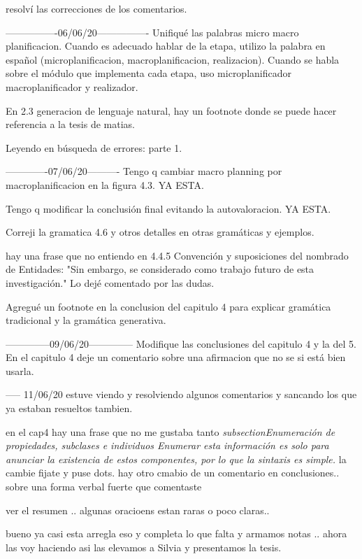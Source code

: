 resolví las correcciones de los comentarios.

----------------06/06/20----------------
Unifiqué las palabras micro macro planificacion. Cuando es adecuado hablar de la etapa, utilizo la palabra en español (microplanificacion, macroplanificacion, realizacion). Cuando se habla sobre el módulo que implementa cada etapa, uso microplanificador macroplanificador y realizador.

En 2.3 generacion de lenguaje natural, hay un footnote donde se puede hacer referencia a la tesis de matias.

Leyendo en búsqueda de errores: parte 1.


-------------07/06/20----------
Tengo q cambiar macro planning por macroplanificacion en la figura 4.3. YA ESTA.

Tengo q modificar la conclusión final evitando la autovaloracion. YA ESTA.

Correji la gramatica 4.6 y otros detalles en otras gramáticas y ejemplos.

hay una frase que no entiendo en 4.4.5 Convención y suposiciones del nombrado de Entidades: "Sin embargo, se considerado como trabajo futuro de esta investigación." Lo dejé comentado por las dudas. 

Agregué un footnote en la conclusion del capitulo 4 para explicar gramática tradicional y la gramática generativa.

--------------09/06/20--------------
Modifique las conclusiones del capitulo 4 y la del 5. En el capitulo 4 deje un comentario sobre una afirmacion que no se si está bien usarla. 

----- 11/06/20
estuve viendo y resolviendo algunos comentarios y sancando los que ya estaban resueltos tambien. 

en el cap4 hay una frase que no me gustaba tanto 
\textit{subsection{Enumeración de propiedades, subclases e individuos}
Enumerar esta información es solo para anunciar la existencia de estos componentes, por lo que la sintaxis es simple.
}
la cambie fijate y puse dots. 
hay otro cmabio de un comentario en conclusiones.. sobre una forma verbal fuerte que comentaste

ver el resumen .. algunas oracioens estan raras o poco claras..

bueno ya casi esta arregla eso y completa lo que falta y armamos notas .. ahora las voy haciendo asi las elevamos a Silvia y presentamos la tesis.

